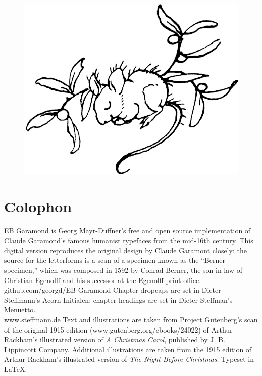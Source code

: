 \documentclass[paper=5.5in:8.5in,BCOR=7mm,twoside,DIV=calc,12pt,usegeometry]{scrbook} %
\begin{document}
\begin{figure}[h!]
\centering
\includegraphics[width=.35\textwidth]{mousie}
\end{figure}

\enlargethispage {2\baselineskip} 

{}
\chapter*{Colophon}

\centering
EB Garamond is Georg Mayr-Duffner's free and open source implementation of Claude Garamond’s famous humanist typefaces from the mid-16th century. This digital version reproduces the original design by Claude Garamont closely: the source for the letterforms is a scan of a specimen known as the “Berner specimen,” which was composed in 1592 by Conrad Berner, the son-in-law of Christian Egenolff and his successor at the Egenolff print office.  \\github.com/georgd/EB-Garamond
\vfill
Chapter dropcaps are set in Dieter Steffmann's Acorn Initialen; chapter headings are set in Dieter Steffman's Menuetto.\\ www.steffmann.de
\vfill
Text and illustrations are taken from Project Gutenberg's scan of the original 1915 edition (www.gutenberg.org/ebooks/24022) of Arthur Rackham's illustrated version of \textit{A Christmas Carol}, published by J. B. Lippincott Company. Additional illustrations are taken from the 1915 edition of Arthur Rackham's illustrated version of \textit{The Night Before Christmas}.
\vfill
Typeset in \LaTeX{}.
\thispagestyle{empty}
\end{document}
